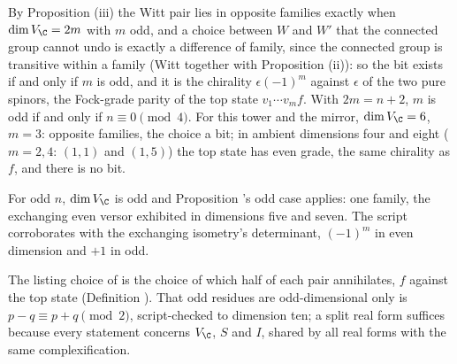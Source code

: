 By Proposition (iii) the Witt pair lies in opposite families exactly when $\dim V_{\C} = 2m$ with $m$ odd, and a choice between $W$ and $W'$ that the connected group cannot undo is exactly a difference of family, since the connected group is transitive within a family (Witt together with Proposition (ii)): so the bit exists if and only if $m$ is odd, and it is the chirality $\epsilon(-1)^{m}$ against $\epsilon$ of the two pure spinors, the Fock-grade parity of the top state $v_{1}\cdots v_{m}f$. With $2m = n + 2$, $m$ is odd if and only if $n \equiv 0 \pmod 4$. For this tower and the mirror, $\dim V_{\C} = 6$, $m = 3$: opposite families, the choice a bit; in ambient dimensions four and eight ($m = 2, 4$: $(1,1)$ and $(1,5)$) the top state has even grade, the same chirality as $f$, and there is no bit.

For odd $n$, $\dim V_{\C}$ is odd and Proposition 's odd case applies: one family, the exchanging even versor exhibited in dimensions five and seven. The script corroborates with the exchanging isometry's determinant, $(-1)^{m}$ in even dimension and $+1$ in odd.

The listing choice of \cite[Prop.~5.6]{ButlerT12} is the choice of which half of each pair annihilates, $f$ against the top state (Definition ). That odd residues are odd-dimensional only is $p - q \equiv p + q \pmod 2$, script-checked to dimension ten; a split real form suffices because every statement concerns $V_{\C}$, $S$ and $I$, shared by all real forms with the same complexification.
